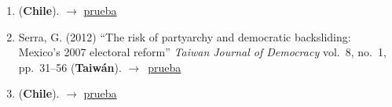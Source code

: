 \documentclass[12 pt, letter]{article}
\newenvironment{CitasMiTrabajo}{
    \begin{footnotesize}
    \begin{enumerate}[label={\footnotesize\emph{cita~\arabic*}},ref=\arabic*] %
        \setlength{\itemsep}{.1\itemsep}
        \setlength{\parskip}{.1\parskip}
    }{\end{enumerate}\end{footnotesize}}
\begin{document}
        \begin{CitasMiTrabajo}

        \item {} (\textbf{Chile}). $\rightarrow$ \href{http://ericmagar.com/cv/cites/magarRomero2008/palma2010.pdf}{prueba}

        \item Serra, G. (2012)
            ``The risk of partyarchy and democratic backsliding: Mexico's 2007 electoral reform''
            \emph{Taiwan Journal of Democracy}
            vol.\ 8, no.\ 1, pp.\ 31--56 (\textbf{Taiw\'an}). $\rightarrow$~\href{http://ericmagar.com/cv/cites/estevezEtalElecStud/serraElecRefMexico2012tjd.pdf}{prueba}

        \item {} (\textbf{Chile}). $\rightarrow$ \href{http://ericmagar.com/cv/cites/magarRomero2008/maldonado2013.pdf}{prueba}

        \label{ncites:magar.romero.2008} %

        \end{CitasMiTrabajo}

\end{document}

